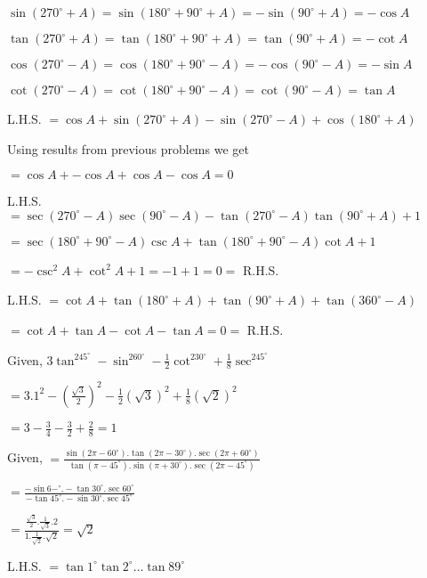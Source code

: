 \item $\sin(270^\circ + A) = \sin(180^\circ + 90^\circ + A) = -\sin(90^\circ + A) = -\cos A$

  $\tan(270^\circ + A) = \tan(180^\circ + 90^\circ + A) = \tan(90^\circ + A) = -\cot A$

\item $\cos(270^\circ - A) = \cos(180^\circ + 90^\circ - A) = -\cos(90^\circ - A) = -\sin A$

  $\cot(270^\circ - A) = \cot(180^\circ + 90^\circ - A) = \cot(90^\circ - A) = \tan A$

\item L.H.S. $= \cos A + \sin(270^\circ + A) - \sin(270^\circ - A) + \cos(180^\circ + A)$

  Using results from previous problems we get

  $= \cos A + -\cos A + \cos A - \cos A = 0$

\item L.H.S. $= \sec(270^\circ - A)\sec(90^\circ - A) - \tan(270^\circ - A)\tan(90^\circ + A) + 1$

  $= \sec(180^\circ + 90^\circ - A)\csc A + \tan(180^\circ + 90^\circ - A)\cot A + 1$

  $= -\csc^2A + \cot^2A + 1 = -1 + 1 = 0 =$ R.H.S.

\item L.H.S. $= \cot A + \tan(180^\circ + A) + \tan(90^\circ + A) + \tan(360^\circ - A)$

  $= \cot A + \tan A - \cot A - \tan A = 0 =$ R.H.S.

\item Given, $3\tan^245^\circ - \sin^260^\circ - \frac{1}{2}\cot^230^\circ + \frac{1}{8}\sec^245^\circ$

  $= 3.1^2 - \left(\frac{\sqrt{3}}{2}\right)^2 - \frac{1}{2}(\sqrt{3})^2 + \frac{1}{8}(\sqrt{2})^2$

  $= 3 - \frac{3}{4} - \frac{3}{2} + \frac{2}{8} = 1$

\item Given, $= \frac{\sin(2\pi - 60^\circ).\tan(2\pi - 30^\circ).\sec(2\pi + 60^\circ)}{\tan(\pi - 45^\circ).\sin(\pi +
  30^\circ).\sec(2\pi - 45^\circ)}$

  $= \frac{-\sin 6-^\circ. -\tan 30^\circ.\sec 60^\circ}{-\tan 45^\circ. -\sin 30^\circ.\sec 45^\circ}$

  $= \frac{\frac{\sqrt{3}}{2}.\frac{1}{\sqrt{3}}.2}{1.\frac{1}{\sqrt{2}}.\sqrt{2}} = \sqrt{2}$

\item L.H.S. $= \tan 1^\circ\tan 2^\circ \ldots \tan 89^\circ$

